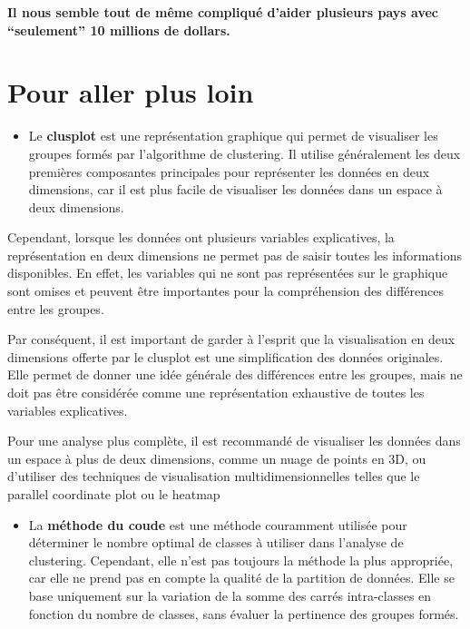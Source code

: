 \documentclass[
]{article}
\providecommand{\tightlist}{%
  \setlength{\itemsep}{0pt}\setlength{\parskip}{0pt}}
\begin{document}
\textbf{Il nous semble tout de même compliqué d'aider plusieurs pays
avec ``seulement'' 10 millions de dollars.}

\hypertarget{pour-aller-plus-loin}{%
\section{Pour aller plus loin}\label{pour-aller-plus-loin}}

\begin{itemize}
\tightlist
\item
  Le \textbf{clusplot} est une représentation graphique qui permet de
  visualiser les groupes formés par l'algorithme de clustering. Il
  utilise généralement les deux premières composantes principales pour
  représenter les données en deux dimensions, car il est plus facile de
  visualiser les données dans un espace à deux dimensions.
\end{itemize}

Cependant, lorsque les données ont plusieurs variables explicatives, la
représentation en deux dimensions ne permet pas de saisir toutes les
informations disponibles. En effet, les variables qui ne sont pas
représentées sur le graphique sont omises et peuvent être importantes
pour la compréhension des différences entre les groupes.

Par conséquent, il est important de garder à l'esprit que la
visualisation en deux dimensions offerte par le clusplot est une
simplification des données originales. Elle permet de donner une idée
générale des différences entre les groupes, mais ne doit pas être
considérée comme une représentation exhaustive de toutes les variables
explicatives.

Pour une analyse plus complète, il est recommandé de visualiser les
données dans un espace à plus de deux dimensions, comme un nuage de
points en 3D, ou d'utiliser des techniques de visualisation
multidimensionnelles telles que le parallel coordinate plot ou le
heatmap

\begin{itemize}
\tightlist
\item
  La \textbf{méthode du coude} est une méthode couramment utilisée pour
  déterminer le nombre optimal de classes à utiliser dans l'analyse de
  clustering. Cependant, elle n'est pas toujours la méthode la plus
  appropriée, car elle ne prend pas en compte la qualité de la partition
  de données. Elle se base uniquement sur la variation de la somme des
  carrés intra-classes en fonction du nombre de classes, sans évaluer la
  pertinence des groupes formés.
\end{itemize}
\end{document}
